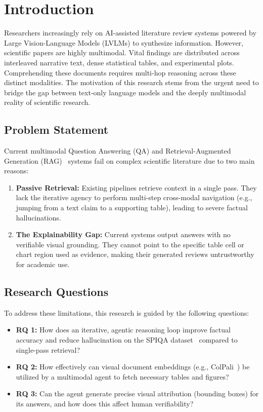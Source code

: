 \chapter{Introduction}
\label{sec:introduction}

Researchers increasingly rely on AI-assisted literature review systems powered by Large Vision-Language Models (LVLMs) to synthesize information. However, scientific papers are highly multimodal. Vital findings are distributed across interleaved narrative text, dense statistical tables, and experimental plots. Comprehending these documents requires multi-hop reasoning across these distinct modalities. The motivation of this research stems from the urgent need to bridge the gap between text-only language models and the deeply multimodal reality of scientific research.

\section{Problem Statement}
Current multimodal Question Answering (QA) and Retrieval-Augmented Generation (RAG)~\cite{lewis2020rag} systems fail on complex scientific literature due to two main reasons:
\begin{enumerate}
    \item \textbf{Passive Retrieval:} Existing pipelines retrieve context in a single pass. They lack the iterative agency to perform multi-step cross-modal navigation (e.g., jumping from a text claim to a supporting table), leading to severe factual hallucinations.
    \item \textbf{The Explainability Gap:} Current systems output answers with no verifiable visual grounding. They cannot point to the specific table cell or chart region used as evidence, making their generated reviews untrustworthy for academic use.
\end{enumerate}

\section{Research Questions}
To address these limitations, this research is guided by the following questions:
\begin{itemize}
    \item \textbf{RQ 1:} How does an iterative, agentic reasoning loop improve factual accuracy and reduce hallucination on the SPIQA dataset~\cite{pramanick2024spiqa} compared to single-pass retrieval?
    \item \textbf{RQ 2:} How effectively can visual document embeddings (e.g., ColPali~\cite{faysse2025colpali}) be utilized by a multimodal agent to fetch necessary tables and figures?
    \item \textbf{RQ 3:} Can the agent generate precise visual attribution (bounding boxes) for its answers, and how does this affect human verifiability?
\end{itemize}

